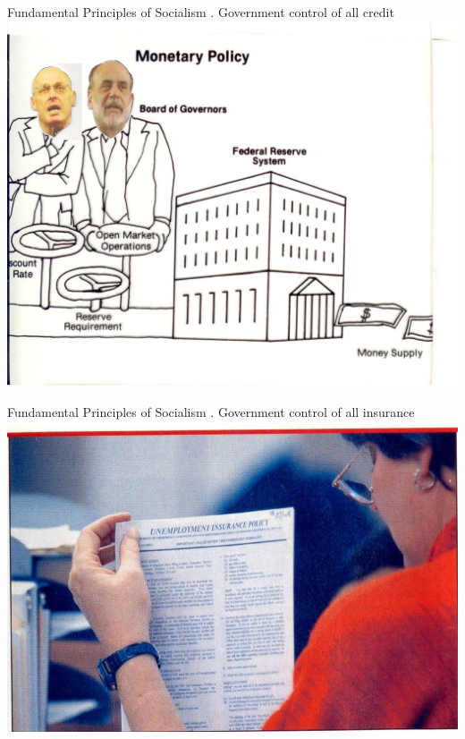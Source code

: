 \begin{frame}{Fundamental Principles of Socialism}
    . Government control of all credit \\
    \includegraphics[width=.9\textwidth]{img/credit.png} \\
\end{frame}

\begin{frame}{Fundamental Principles of Socialism}
    . Government control of all insurance \\
    \includegraphics[width=.9\textwidth]{img/insurance.jpg} \\
\end{frame}

